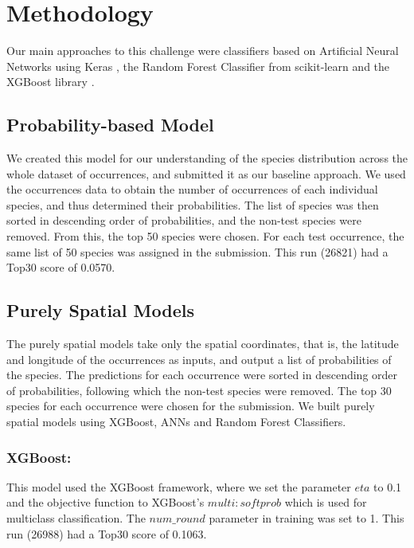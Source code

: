 \documentclass[runningheads]{llncs}
\begin{document}
\section{Methodology}
Our main approaches to this challenge were classifiers based on Artificial Neural Networks using Keras \cite{keras}, the Random Forest Classifier from scikit-learn \cite{scikit-learn} and the XGBoost library \cite{xgboost}.
\subsection{Probability-based Model}
We created this model for our understanding of the species distribution across the whole dataset of occurrences, and submitted it as our baseline approach. We used the occurrences data to obtain the number of occurrences of each individual species, and thus determined their probabilities. The list of species was then sorted in descending order of probabilities, and the non-test species were removed. From this, the top 50 species were chosen. For each test occurrence, the same list of 50 species was assigned in the submission. This run (26821) had a Top30 score of 0.0570.
\subsection{Purely Spatial Models}
The purely spatial models take only the spatial coordinates, that is, the latitude and longitude of the occurrences as inputs, and output a list of probabilities of the species. The predictions for each occurrence were sorted in descending order of probabilities, following which the non-test species were removed. The top 30 species for each occurrence were chosen for the submission. We built purely spatial models using XGBoost, ANNs and Random Forest Classifiers.
\subsubsection{XGBoost:} This model used the XGBoost framework, where we set the parameter $eta$ to 0.1 and the objective function to XGBoost's $multi:softprob$ which is used for multiclass classification. The $num\_round$ parameter in training was set to 1. This run (26988) had a Top30 score of 0.1063. 
\end{document}
